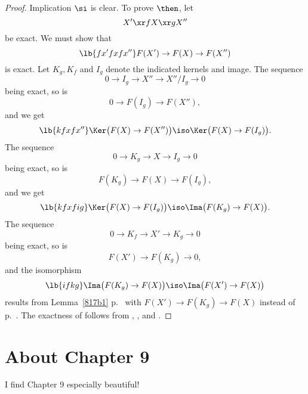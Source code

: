 \documentclass[12pt]{article}
\theoremstyle{remark}
\theoremstyle{definition}
\begin{document}
\begin{proof}
Implication $\si$ is clear. To prove $\then$, let 
$$
X'\xr fX\xr gX''
$$
be exact. We must show that 
%
\begin{equation}\lb{fx'fxfx''}
F(X')\to F(X)\to F(X'')
\end{equation} 
% 
is exact. Let $K_g,K_f$ and $I_g$ denote the indicated kernels and image. The sequence 
$$ 
0\to I_g\to X''\to X''/I_g\to 0
$$ 
being exact, so is 
$$ 
0\to F(I_g)\to F(X''), 
$$ 
and we get 
%
\begin{equation}\lb{kfxfx''}
\Ker\big(F(X)\to F(X'')\big)\iso\Ker\big(F(X)\to F(I_g)\big). 
\end{equation} 
% 
The sequence 
$$ 
0\to K_g\to X\to I_g\to 0
$$ 
being exact, so is 
$$ 
F(K_g)\to F(X)\to F(I_g), 
$$ 
and we get 
%
\begin{equation}\lb{kfxfig}
\Ker\big(F(X)\to F(I_g)\big)\iso\Ima\big(F(K_g)\to F(X)\big). 
\end{equation} 
% 
The sequence 
$$ 
0\to K_f\to X'\to K_g\to 0 
$$ 
being exact, so is 
$$ 
F(X')\to F(K_g)\to0,  
$$ 
and the isomorphism 
%
\begin{equation}\lb{ifkg}
\Ima\big(F(K_g)\to F(X)\big)\iso\Ima\big(F(X')\to F(X)\big)  
\end{equation} 
% 
results from Lemma~\ref{817b1} p.~ with $F(X')\to F(K_g)\to F(X)$ instead of  p.~. The exactness of  follows from , , and .
\end{proof} 


\section{About Chapter 9}

I find Chapter 9 especially beautiful!

\end{document}

